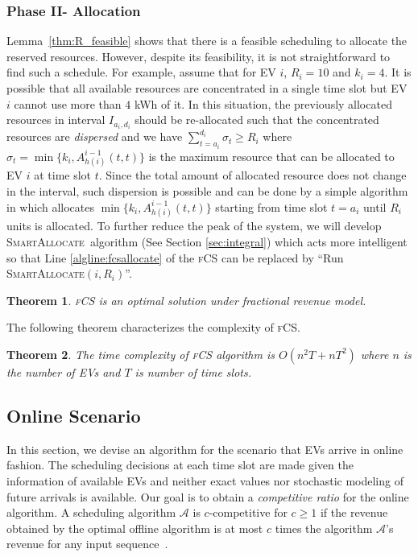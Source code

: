 \documentclass[journal]{IEEEtran}
\newcommand{\revv}[1]{{\color{black}#1}}%
\newcommand{\sa}{\textsc{SmartAllocate}}
\newcommand{\fcs}{\textsc{fCS}\xspace}
\newtheorem{thm}{Theorem}
\begin{document}
{\subsubsection{Phase II- Allocation\label{sec:ph2}} Lemma~\ref{thm:R_feasible} shows that there is a feasible scheduling to allocate the reserved resources.
However, despite its feasibility, it is not straightforward to find such \revv{a schedule}. For example, assume that for EV $i$, $R_i=10$ and $k_i=4$. It is possible that all available resources are concentrated in a single time slot but EV $i$ cannot use more than $4$ kWh of it. In this situation, the previously allocated resources in interval $I_{a_i,d_i}$ should be re-allocated such that the concentrated resources are \emph{dispersed} and we have $\sum_{t=a_i}^{d_i}\sigma_t \geq R_i$ where $\sigma_t =\min\{k_i,A^{i-1}_{h(i)}(t,t)\}$ is the maximum resource that can be allocated to EV $i$ at time slot $t$. Since the total amount of allocated resource does not change in the interval, such dispersion is possible and can be done by a simple algorithm in which allocates $\min\{k_i,A^{i-1}_{h(i)}(t,t)\}$ starting from time slot $t=a_i$ until $R_i$ units is allocated. To further reduce the peak of the system, we will develop \sa\ algorithm (See Section \ref{sec:integral}) which acts more intelligent so that Line \ref{algline:fcsallocate} of the \fcs can be replaced by ``Run \sa$(i,R_i)$''.



\begin{thm}
	\label{cor:1}
	\fcs is an optimal solution under fractional revenue model.
\end{thm}

The following theorem characterizes the complexity of \fcs.

\begin{thm}
	\label{thm:complexity}
	The time complexity of \fcs algorithm is $O(n^2T+nT^2)$ where $n$ is the number of EVs and $T$ is number of time slots.
\end{thm}
}

\subsection{Online Scenario}
\label{sec:fonline}
In this section, we devise an algorithm for the scenario that EVs arrive in online fashion. The scheduling decisions at each time slot are made given the information of available EVs and neither exact values nor stochastic modeling of future arrivals is available. Our goal is to obtain a \emph{competitive ratio} for the online algorithm. A scheduling algorithm $\mathcal{A}$ is $c$-competitive for $c\geq 1$ if the revenue obtained by the optimal offline algorithm is at most $c$ times the algorithm $\mathcal{A}$'s revenue for any input sequence~\cite{borodin2005online}.
\end{document}
